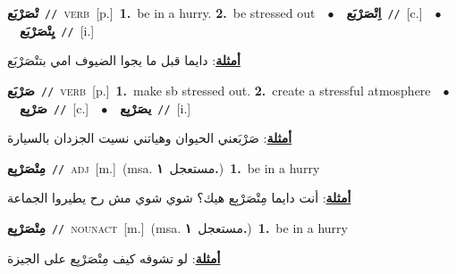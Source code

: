 \documentclass[10pt,a4paper,twoside]{article} %
\begin{document}
\begin{multicols}{2}
{\setlength\topsep{0pt}\textbf{\foreignlanguage{arabic}{تْصَرْبَع}}\ {\color{gray}\texttt{//}\color{black}}\ \textsc{verb}\ [p.]\ \textbf{1.}~be in a hurry.  \textbf{2.}~be stressed out\ \ $\bullet$\ \ \setlength\topsep{0pt}\textbf{\foreignlanguage{arabic}{اِتْصَرْبَع}}\ {\color{gray}\texttt{//}\color{black}}\ [c.]\ \ $\bullet$\ \ \setlength\topsep{0pt}\textbf{\foreignlanguage{arabic}{يِتْصَرْبَع}}\ {\color{gray}\texttt{//}\color{black}}\ [i.]\  \begin{flushright}\color{gray}\foreignlanguage{arabic}{\textbf{\underline{\foreignlanguage{arabic}{أمثلة}}}: دايما قبل ما يجوا الضيوف امي بتتْصَرْبَع}\end{flushright}\color{black}} \vspace{2mm}

{\setlength\topsep{0pt}\textbf{\foreignlanguage{arabic}{صَرْبَع}}\ {\color{gray}\texttt{//}\color{black}}\ \textsc{verb}\ [p.]\ \textbf{1.}~make sb stressed out.  \textbf{2.}~create a stressful atmosphere\ \ $\bullet$\ \ \setlength\topsep{0pt}\textbf{\foreignlanguage{arabic}{صَرْبِع}}\ {\color{gray}\texttt{//}\color{black}}\ [c.]\ \ $\bullet$\ \ \setlength\topsep{0pt}\textbf{\foreignlanguage{arabic}{يصَرْبِع}}\ {\color{gray}\texttt{//}\color{black}}\ [i.]\  \begin{flushright}\color{gray}\foreignlanguage{arabic}{\textbf{\underline{\foreignlanguage{arabic}{أمثلة}}}: صَرْبَعني الحيوان وهياتني نسيت الجزدان بالسيارة}\end{flushright}\color{black}} \vspace{2mm}

{\setlength\topsep{0pt}\textbf{\foreignlanguage{arabic}{مِتْصَرْبِع}}\ {\color{gray}\texttt{//}\color{black}}\ \textsc{adj}\ [m.]\ \color{gray}(msa. \foreignlanguage{arabic}{مستعجل}~\foreignlanguage{arabic}{\textbf{١.}})\color{black}\ \textbf{1.}~be in a hurry\  \begin{flushright}\color{gray}\foreignlanguage{arabic}{\textbf{\underline{\foreignlanguage{arabic}{أمثلة}}}: أنت دايما مِتْصَرْبِع هيك؟ شوي شوي مش رح يطيروا الجماعة}\end{flushright}\color{black}} \vspace{2mm}

{\setlength\topsep{0pt}\textbf{\foreignlanguage{arabic}{مِتْصَرْبِع}}\ {\color{gray}\texttt{//}\color{black}}\ \textsc{noun\textunderscore act}\ [m.]\ \color{gray}(msa. \foreignlanguage{arabic}{مستعجل}~\foreignlanguage{arabic}{\textbf{١.}})\color{black}\ \textbf{1.}~be in a hurry\  \begin{flushright}\color{gray}\foreignlanguage{arabic}{\textbf{\underline{\foreignlanguage{arabic}{أمثلة}}}: لو تشوفه كيف مِتْصَرْبِع على الجيزة}\end{flushright}\color{black}} \vspace{2mm}


\end{multicols}
\end{document}
